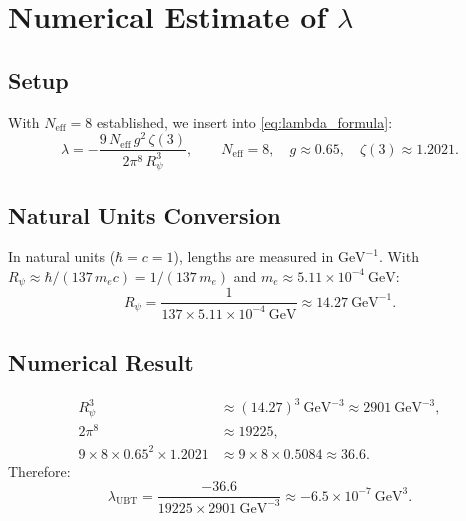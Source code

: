 \documentclass[12pt]{article}
\theoremstyle{definition}
\theoremstyle{remark}
\begin{document}
\section{Numerical Estimate of $\lambda$}
\label{sec:lambda_numerical}

\subsection{Setup}

With $N_{\text{eff}} = 8$ established, we insert into
\eqref{eq:lambda_formula}:
\begin{equation}
  \lambda = -\frac{9\,N_{\text{eff}}\,g^2\,\zeta(3)}{2\pi^8\,R_\psi^3},
  \qquad
  N_{\text{eff}} = 8,\quad g \approx 0.65,\quad \zeta(3) \approx 1.2021.
\end{equation}

\subsection{Natural Units Conversion}

In natural units ($\hbar = c = 1$), lengths are measured in
$\text{GeV}^{-1}$.  With $R_\psi \approx \hbar/(137\,m_e c) =
1/(137\,m_e)$ and $m_e \approx 5.11 \times 10^{-4}~\text{GeV}$:
\begin{equation}
  R_\psi = \frac{1}{137 \times 5.11 \times 10^{-4}~\text{GeV}}
          \approx 14.27~\text{GeV}^{-1}.
  \label{eq:Rpsi_natural}
\end{equation}

\subsection{Numerical Result}

\begin{align}
  R_\psi^3 &\approx (14.27)^3~\text{GeV}^{-3} \approx 2901~\text{GeV}^{-3}, \\
  2\pi^8   &\approx 19225, \\
  9 \times 8 \times 0.65^2 \times 1.2021 &\approx 9 \times 8 \times 0.5084
    \approx 36.6.
\end{align}
Therefore:
\begin{equation}
  \label{eq:lambda_numerical}
  \lambda_{\text{UBT}}
  = \frac{-36.6}{19225 \times 2901~\text{GeV}^{-3}}
  \approx -6.5 \times 10^{-7}~\text{GeV}^{3}.
\end{equation}
\end{document}
